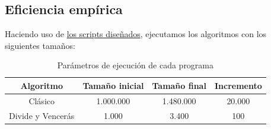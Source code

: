 \documentclass[12pt,spanish]{article}
\begin{document}
\subsection{Eficiencia empírica}

Haciendo uso de \textcolor{blue!60}{\hyperref[sec:scripts]{los scripts diseñados}}, ejecutamos los algoritmos con los siguientes tamaños:

\begin{table}[H]
\centering
\begin{tabular}{|c|c|c|c|}
\hline
\textbf{Algoritmo}  & \textbf{Tamaño inicial} & \textbf{Tamaño final} & \textbf{Incremento}\\
\hline
Clásico & 1.000.000 & 1.480.000 & 20.000 \\
Divide y Vencerás & 1.000 & 3.400 & 100\\
\hline
\end{tabular}
\caption{Parámetros de ejecución de cada programa}
\end{table}
\end{document}
